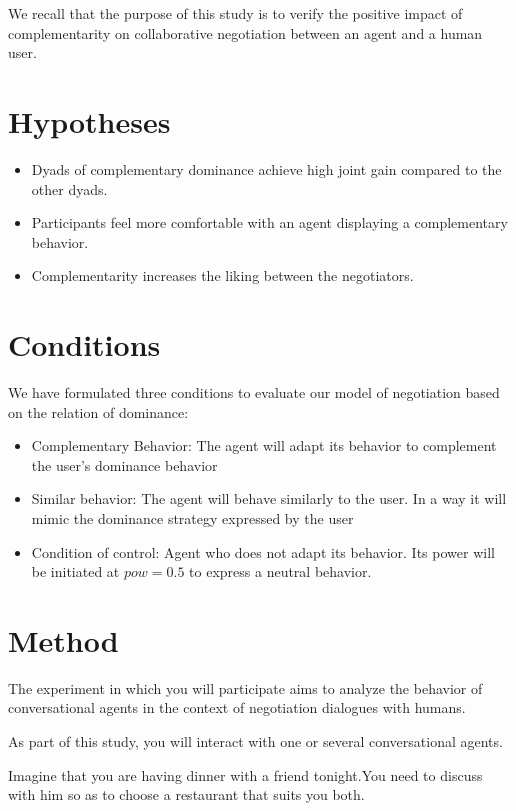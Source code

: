 \documentclass [french]{paper}
\begin{document}
		
		We recall that the purpose of this study is to verify the positive impact of complementarity on collaborative negotiation between an agent and a human user.
	
		
		\section{Hypotheses}
		\begin{itemize}
			\item Dyads of complementary dominance achieve high joint gain compared to the other dyads.
			\item Participants feel more comfortable with an agent displaying a complementary behavior.
			\item Complementarity increases the liking between the negotiators.
		\end{itemize}

			
		\section{Conditions}
			We have formulated three conditions to evaluate our model of negotiation based on the relation of dominance:

			\begin{itemize}
				\item Complementary Behavior: The agent will adapt its behavior to complement the user's dominance behavior
				
				\item Similar behavior: The agent will behave similarly to the user. In a way it will mimic the dominance strategy expressed by the user
				
				\item Condition of control: Agent who does not adapt its behavior. Its power will be initiated at $ pow = 0.5 $ to express a neutral behavior.
			\end{itemize}
			
			
		\section{Method}
			The experiment in which you will participate aims to analyze the behavior of conversational agents in the context of negotiation dialogues with  humans.
			
			As part of this study, you will interact with one or several conversational agents.
			
			Imagine that you are having dinner with a friend tonight.You need to discuss with him so as to choose a restaurant that suits you both.
			
\end{document}
